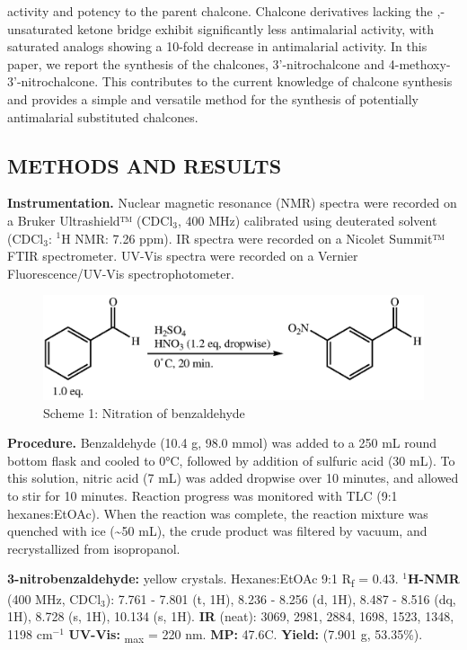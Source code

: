 \documentclass[11pt]{article}
\let\bf\textbf
\begin{document}
activity and potency to the parent chalcone.\cite{Larsen2005} Chalcone derivatives lacking the \textalpha,\textbeta-unsaturated ketone bridge exhibit significantly less antimalarial activity, with saturated analogs showing a 10-fold decrease in antimalarial activity.\cite{Li1995} In this paper, we report the synthesis of the chalcones, 3'-nitrochalcone and 4-methoxy-3'-nitrochalcone. This contributes to the current knowledge of chalcone synthesis and provides a simple and versatile method for the synthesis of potentially antimalarial substituted chalcones.
\subsection*{METHODS AND RESULTS}
\bf{Instrumentation.} Nuclear magnetic resonance (NMR) spectra were recorded on a Bruker Ultrashield™ (CDCl$_3$, 400 MHz) calibrated using deuterated solvent (CDCl$_3$: $^1$H NMR: 7.26 ppm). IR spectra were recorded on a Nicolet Summit™ FTIR spectrometer. UV-Vis spectra were recorded on a Vernier Fluorescence/UV-Vis spectrophotometer.

\begin{figure}[H]
    \centering
    \includegraphics[scale=0.8]{schemes/nitration.eps}
    \captionsetup{labelformat=empty}
    \caption{Scheme 1: Nitration of benzaldehyde}
\end{figure}
\bf{Procedure.} Benzaldehyde (10.4 g, 98.0 mmol) was added to a 250 mL round bottom flask and cooled to 0°C, followed by addition of sulfuric acid (30 mL). To this solution, nitric acid (7 mL) was added dropwise over 10 minutes, and allowed to stir for 10 minutes. Reaction progress was monitored with TLC (9:1 hexanes:EtOAc). When the reaction was complete, the reaction mixture was quenched with ice (\textasciitilde 50 mL), the crude product was filtered by vacuum, and recrystallized from isopropanol.

\noindent\bf{3-nitrobenzaldehyde:} yellow crystals. Hexanes:EtOAc 9:1 R\textsubscript{f} = 0.43. \bf{$^1$H-NMR} (400 MHz, CDCl$_3$): \textdelta\hspace{0mm} 7.761 - 7.801 (t, 1H), 8.236 - 8.256 (d, 1H), 8.487 - 8.516 (dq, 1H), 8.728 (s, 1H), 10.134 (s, 1H). \bf{IR} (neat): 3069, 2981, 2884, 1698, 1523, 1348, 1198 cm$^{-1}$ \bf{UV-Vis:} \textlambda\textsubscript{max} = 220 nm. \bf{MP:} 47.6\degree C. \bf{Yield:} (7.901 g, 53.35\%).
\end{document}
